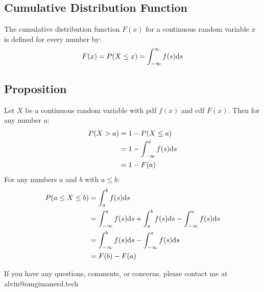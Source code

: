 \documentclass[letterpaper, 12pt]{math}
\begin{document}
\subsection*{Cumulative Distribution Function}
The cumulative distribution function \( F(x) \) for a continuous random variable
\( x \) is defined for every number by:
\[ F(x) = P(X\leq x) = \int_{-\infty}^{\infty}f(s)\mathrm{d}{s} \]

\subsection*{Proposition}
Let \( X \) be a continuous random variable with pdf \( f(x) \) and cdf
\( F(x) \). Then for any number \( a \):
\begin{align*}
  P(X>a) &= 1-P(X\leq a) \\
  &= 1-\int_{-\infty}^{a}f(s)\mathrm{d}{s} \\
  &= 1-F(a)
\end{align*}
For any numbers \( a \) and \( b \) with \( a \leq b \):
\begin{align*}
  P(a\leq X\leq b) &= \int_{a}^{b}f(s)\mathrm{d}{s} \\
  &= \int_{-\infty}^{a}f(s)\mathrm{d}{s}+\int_{a}^{b}f(s)\mathrm{d}{s}-
    \int_{-\infty}^{a}f(s)\mathrm{d}{s} \\
  &= \int_{-\infty}^{b}f(s)\mathrm{d}{s}-\int_{-\infty}^{a}f(s)\mathrm{d}{s} \\
  &= F(b)-F(a)
\end{align*}

\begin{center}
  If you have any questions, comments, or concerns, please contact me at
  alvin@omgimanerd.tech
\end{center}
\end{document}
